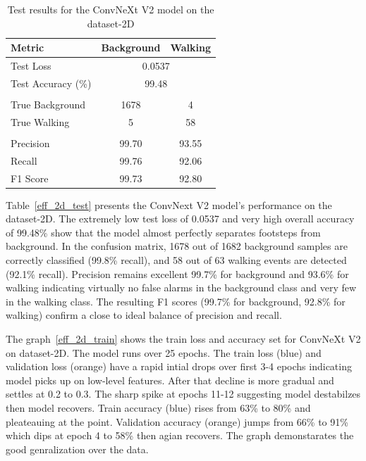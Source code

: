 \begin{table}[ht]
    \centering
    \caption{Test results for the ConvNeXt V2 model on the dataset-2D}
    \label{conv_2d_test}
    \begin{tabular}{lcc}
      \toprule
      \textbf{Metric}            & \textbf{Background} & \textbf{Walking} \\
      \midrule
      Test Loss                  & \multicolumn{2}{c}{0.0537}          \\
      Test Accuracy (\%)         & \multicolumn{2}{c}{99.48}           \\
      \addlinespace
      \multicolumn{3}{l}{\textbf{Confusion Matrix}} \\
      \quad True Background      & 1678                & 4               \\
      \quad True Walking         & 5                   & 58              \\
      \addlinespace
      \multicolumn{3}{l}{\textbf{Per-class Precision, Recall, F1 (\%)}} \\
      Precision                  & 99.70               & 93.55           \\
      Recall                     & 99.76               & 92.06           \\
      F1 Score                   & 99.73               & 92.80           \\
      \bottomrule
    \end{tabular}
  \end{table}

Table~\ref{eff_2d_test} presents the ConvNext V2 model's performance on the dataset-2D. The extremely low test loss of 0.0537 and very high overall accuracy of 99.48\% show that the model almost perfectly separates footsteps from background. In the confusion matrix, 1678 out of 1682 background samples are correctly classified (99.8\% recall), and 58 out of 63 walking events are detected (92.1\% recall). Precision remains excellent 99.7\% for background and 93.6\% for walking indicating virtually no false alarms in the background class and very few in the walking class. The resulting F1 scores (99.7\% for background, 92.8\% for walking) confirm a close to ideal balance of precision and recall.

The graph~\ref{eff_2d_train} shows the train loss and accuracy set for ConvNeXt V2 on dataset-2D. The model runs over 25  epochs. The train loss (blue) and validation loss (orange) have a rapid intial drops over first 3-4 epochs indicating model picks up on low-level features. After that decline is more gradual and settles at 0.2 to 0.3. The sharp spike at epochs 11-12 suggesting model destabilzes then model recovers. Train accuracy (blue) rises from 63\% to 80\% and pleateauing at the point. Validation accuracy (orange) jumps from 66\% to 91\% which dips at epoch 4 to 58\% then agian recovers. The graph demonstarates the good genralization over the data.

